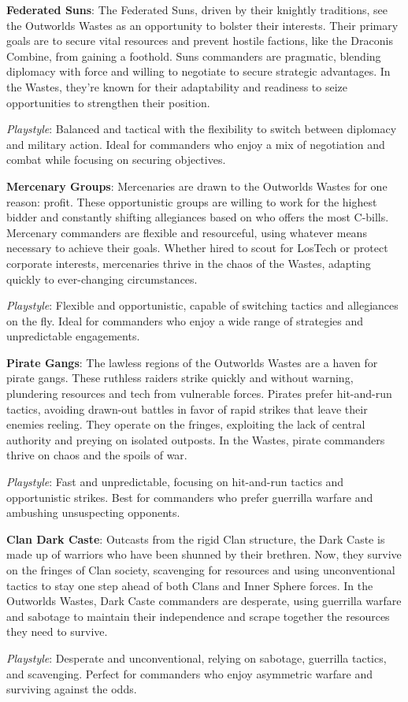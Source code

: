 {\bfseries Federated Suns}:
The Federated Suns, driven by their knightly traditions, see the Outworlds Wastes as an opportunity to bolster their interests.
Their primary goals are to secure vital resources and prevent hostile factions, like the Draconis Combine, from gaining a foothold.
Suns commanders are pragmatic, blending diplomacy with force and willing to negotiate to secure strategic advantages.
In the Wastes, they're known for their adaptability and readiness to seize opportunities to strengthen their position.

\emph{Playstyle}:
Balanced and tactical with the flexibility to switch between diplomacy and military action.
Ideal for commanders who enjoy a mix of negotiation and combat while focusing on securing objectives.

{\bfseries Mercenary Groups}:
Mercenaries are drawn to the Outworlds Wastes for one reason: profit.
These opportunistic groups are willing to work for the highest bidder and constantly shifting allegiances based on who offers the most C-bills.
Mercenary commanders are flexible and resourceful, using whatever means necessary to achieve their goals.
Whether hired to scout for LosTech or protect corporate interests, mercenaries thrive in the chaos of the Wastes, adapting quickly to ever-changing circumstances.

\emph{Playstyle}:
Flexible and opportunistic, capable of switching tactics and allegiances on the fly.
Ideal for commanders who enjoy a wide range of strategies and unpredictable engagements.

{\bfseries Pirate Gangs}:
The lawless regions of the Outworlds Wastes are a haven for pirate gangs.
These ruthless raiders strike quickly and without warning, plundering resources and tech from vulnerable forces.
Pirates prefer hit-and-run tactics, avoiding drawn-out battles in favor of rapid strikes that leave their enemies reeling.
They operate on the fringes, exploiting the lack of central authority and preying on isolated outposts.
In the Wastes, pirate commanders thrive on chaos and the spoils of war.

\emph{Playstyle}:
Fast and unpredictable, focusing on hit-and-run tactics and opportunistic strikes.
Best for commanders who prefer guerrilla warfare and ambushing unsuspecting opponents.

{\bfseries Clan Dark Caste}:
Outcasts from the rigid Clan structure, the Dark Caste is made up of warriors who have been shunned by their brethren.
Now, they survive on the fringes of Clan society, scavenging for resources and using unconventional tactics to stay one step ahead of both Clans and Inner Sphere forces.
In the Outworlds Wastes, Dark Caste commanders are desperate, using guerrilla warfare and sabotage to maintain their independence and scrape together the resources they need to survive.

\emph{Playstyle}:
Desperate and unconventional, relying on sabotage, guerrilla tactics, and scavenging.
Perfect for commanders who enjoy asymmetric warfare and surviving against the odds.
